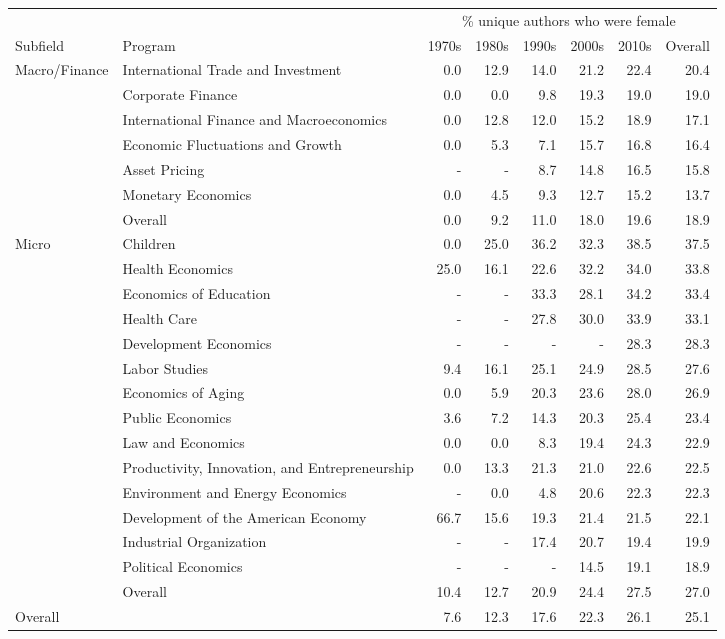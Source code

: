 
\begin{tabular}{llrrrrrr}
\toprule
 & & \multicolumn{6}{c}{\% unique authors who were female}\\
\cmidrule(lr){3-8}
Subfield & Program & 1970s & 1980s & 1990s & 2000s & 2010s & Overall\\
\midrule
Macro/Finance & International Trade and Investment & 0.0 & 12.9 & 14.0 & 21.2 & 22.4 & 20.4\\
 & Corporate Finance & 0.0 & 0.0 & 9.8 & 19.3 & 19.0 & 19.0\\
 & International Finance and Macroeconomics & 0.0 & 12.8 & 12.0 & 15.2 & 18.9 & 17.1\\
 & Economic Fluctuations and Growth & 0.0 & 5.3 & 7.1 & 15.7 & 16.8 & 16.4\\
 & Asset Pricing & - & - & 8.7 & 14.8 & 16.5 & 15.8\\
 & Monetary Economics & 0.0 & 4.5 & 9.3 & 12.7 & 15.2 & 13.7\\
\cmidrule(lr){2-8}
 & Overall & 0.0 & 9.2 & 11.0 & 18.0 & 19.6 & 18.9\\
\midrule
Micro & Children & 0.0 & 25.0 & 36.2 & 32.3 & 38.5 & 37.5\\
 & Health Economics & 25.0 & 16.1 & 22.6 & 32.2 & 34.0 & 33.8\\
 & Economics of Education & - & - & 33.3 & 28.1 & 34.2 & 33.4\\
 & Health Care & - & - & 27.8 & 30.0 & 33.9 & 33.1\\
 & Development Economics & - & - & - & - & 28.3 & 28.3\\
 & Labor Studies & 9.4 & 16.1 & 25.1 & 24.9 & 28.5 & 27.6\\
 & Economics of Aging & 0.0 & 5.9 & 20.3 & 23.6 & 28.0 & 26.9\\
 & Public Economics & 3.6 & 7.2 & 14.3 & 20.3 & 25.4 & 23.4\\
 & Law and Economics & 0.0 & 0.0 & 8.3 & 19.4 & 24.3 & 22.9\\
 & Productivity, Innovation, and Entrepreneurship & 0.0 & 13.3 & 21.3 & 21.0 & 22.6 & 22.5\\
 & Environment and Energy Economics & - & 0.0 & 4.8 & 20.6 & 22.3 & 22.3\\
 & Development of the American Economy & 66.7 & 15.6 & 19.3 & 21.4 & 21.5 & 22.1\\
 & Industrial Organization & - & - & 17.4 & 20.7 & 19.4 & 19.9\\
 & Political Economics & - & - & - & 14.5 & 19.1 & 18.9\\
\cmidrule(lr){2-8}
 & Overall & 10.4 & 12.7 & 20.9 & 24.4 & 27.5 & 27.0\\
\midrule
Overall &  & 7.6 & 12.3 & 17.6 & 22.3 & 26.1 & 25.1\\
\bottomrule
\end{tabular}
